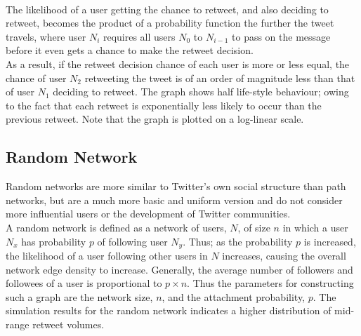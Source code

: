 \\
The likelihood of a user getting the chance to retweet, and also deciding to retweet, becomes the product of a probability function the further the tweet travels, where user $ N_i $ requires all users $ N_0 $ to $ N_{i-1} $ to pass on the message before it even gets a chance to make the retweet decision.
\\
As a result, if the retweet decision chance of each user is more or less equal, the chance of user $ N_2  $ retweeting the tweet is of an order of magnitude less than that of user $ N_1 $ deciding to retweet. The graph shows half life-style behaviour; owing to the fact that each retweet is exponentially less likely to occur than the previous retweet. Note that the graph is plotted on a log-linear scale.

\subsection{Random Network}
Random networks are more similar to Twitter's own social structure than path networks, but are a much more basic and uniform version and do not consider more influential users or the development of Twitter communities.
\\
A random network is defined as a network of users, $ N $, of size $ n $ in which a user $ N_x $ has probability $ p $ of following user $ N_y $. Thus; as the probability $ p $ is increased, the likelihood of a user following other users in $ N $ increases, causing the overall network edge density to increase. Generally, the average number of followers and followees of a user is proportional to $ p\times n $. Thus the parameters for constructing such a graph are the network size, $n$, and the attachment probability, $p$. The simulation results for the random network indicates a higher distribution of mid-range retweet volumes.
\begin{figure}[h]
\end{figure}
